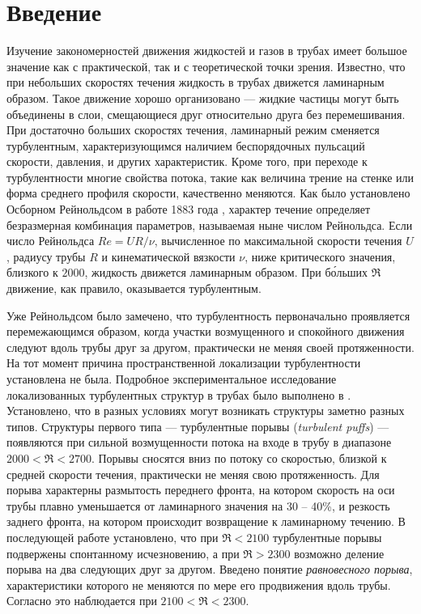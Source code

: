 \renewcommand \thechapter {i}
\thispagestyle{empty}
\phantom{.}
\chapter*{Введение}


Изучение закономерностей движения жидкостей и газов в трубах имеет большое значение как с практической, так и с теоретической точки зрения. Известно, что при небольших скоростях течения жидкость в трубах движется ламинарным образом. Такое движение хорошо организовано --- жидкие частицы могут быть объединены в слои, смещающиеся друг относительно друга без перемешивания. При достаточно больших скоростях течения, ламинарный режим сменяется турбулентным, характеризующимся наличием беспорядочных пульсаций скорости, давления, и других характеристик. Кроме того, при переходе к турбулентности многие свойства потока, такие как величина трение на стенке или форма среднего профиля скорости, качественно меняются. Как было установлено Осборном Рейнольдсом в работе 1883 года \cite{Reynolds1883}, характер течение определяет безразмерная комбинация параметров, называемая ныне числом Рейнольдса. Если число Рейнольдса $Re=UR/\nu$, вычисленное по максимальной скорости течения $U$, радиусу трубы $R$ и кинематической вязкости $\nu$, ниже критического значения, близкого к $2000$, жидкость движется ламинарным образом. При б\'{о}льших $\Re$ движение, как правило, оказывается турбулентным.

Уже Рейнольдсом было замечено, что турбулентность первоначально проявляется перемежающимся образом, когда участки возмущенного и спокойного движения следуют вдоль трубы друг за другом, практически не меняя своей протяженности. На тот момент причина пространственной локализации турбулентности установлена не была. Подробное экспериментальное исследование локализованных турбулентных структур в трубах было выполнено в \cite{Wygnanski1973}. Установлено, что в разных условиях могут возникать структуры заметно разных типов. Структуры первого типа --- турбулентные порывы ({\it turbulent puffs}) --- появляются при сильной возмущенности потока на входе в трубу в диапазоне $2000<\Re<2700$. Порывы сносятся вниз по потоку со скоростью, близкой к средней скорости течения, практически не меняя свою протяженность. Для порыва характерны размытость переднего фронта, на котором скорость на оси трубы плавно уменьшается от ламинарного значения на 30 -- 40\%, и резкость заднего фронта, на котором происходит возвращение к ламинарному течению. В последующей работе \cite{Wygnanski1975} установлено, что при $\Re<2100$ турбулентные порывы подвержены спонтанному исчезновению, а при $\Re>2300$ возможно деление порыва на два следующих друг за другом. Введено понятие {\it равновесного порыва}, характеристики которого не меняются по мере его продвижения вдоль трубы. Согласно \cite{Wygnanski1975} это наблюдается при $2100 < \Re < 2300$. 

